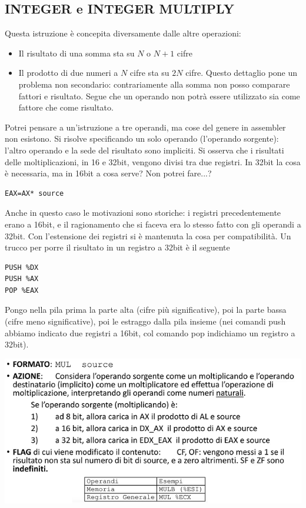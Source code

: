 \documentclass[11pt]{report}
\begin{document}
\subsection{INTEGER e INTEGER MULTIPLY}
Questa istruzione è concepita diversamente dalle altre operazioni: 
\begin{itemize}
\item Il risultato di una somma sta su $N$ o $N+1$ cifre
\item Il prodotto di due numeri a $N$ cifre sta su $2N$ cifre. Questo dettaglio pone un problema non secondario: contrariamente alla somma non posso comparare fattori e risultato. Segue che un operando non potrà essere utilizzato sia come fattore che come risultato.
\end{itemize}
Potrei pensare a un'istruzione a tre operandi, ma cose del genere in assembler non esistono. Si risolve specificando un solo operando (l'operando sorgente): l'altro operando e la sede del risultato sono impliciti. Si osserva che i risultati delle moltiplicazioni, in 16 e 32bit, vengono divisi tra due registri. In 32bit la cosa è necessaria, ma in 16bit a cosa serve? Non potrei fare...?
\begin{verbatim}
EAX=AX* source
\end{verbatim}
Anche in questo caso le motivazioni sono storiche: i registri precedentemente erano a 16bit, e il ragionamento che si faceva era lo stesso fatto con gli operandi a 32bit. Con l'estensione dei registri si è mantenuta la cosa per compatibilità.
Un trucco per porre il risultato in un registro a 32bit è il seguente
\begin{verbatim}
PUSH %DX
PUSH %AX
POP %EAX
\end{verbatim}
Pongo nella pila prima la parte alta (cifre più significative), poi la parte bassa (cifre meno significative), poi le estraggo dalla pila insieme (nei comandi push abbiamo indicato due registri a 16bit, col comando pop indichiamo un registro a 32bit).
\begin{center}
\includegraphics{img/19.PNG}
\end{center}
\end{document}
